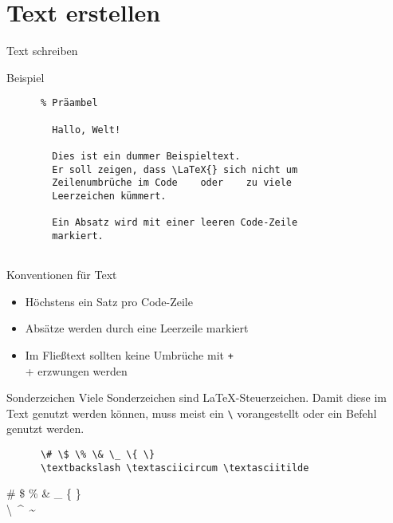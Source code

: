 \section{Text erstellen}

\begin{frame}[fragile]{Text schreiben}
  \begin{block}{Beispiel}
    \begin{verbatim}
      % Präambel
      
        Hallo, Welt!

        Dies ist ein dummer Beispieltext.
        Er soll zeigen, dass \LaTeX{} sich nicht um
        Zeilenumbrüche im Code    oder    zu viele
        Leerzeichen kümmert.

        Ein Absatz wird mit einer leeren Code-Zeile
        markiert.
      
    \end{verbatim}
  \end{block}
\end{frame}

\begin{frame}[fragile]{Konventionen für Text}
  \begin{itemize}
    \item Höchstens ein Satz pro Code-Zeile
    \item Absätze werden durch eine Leerzeile markiert
    \item Im Fließtext sollten keine Umbrüche mit \texttt+\\+ erzwungen werden
  \end{itemize}
  \begin{alertblock}{Sonderzeichen}
    Viele Sonderzeichen sind \LaTeX-Steuerzeichen.
    Damit diese im Text genutzt werden können, muss meist ein \verb+\+ vorangestellt oder ein Befehl genutzt werden.
  \end{alertblock}
  \begin{CodeExample}{0.7}
    \begin{verbatim}
      \# \$ \% \& \_ \{ \}
      \textbackslash \textasciicircum \textasciitilde
    \end{verbatim}
  \CodeResult
    \strut
    \# \$ \% \& \_ \{ \} \\
    \textbackslash\ \textasciicircum\ \textasciitilde
  \end{CodeExample}
\end{frame}

